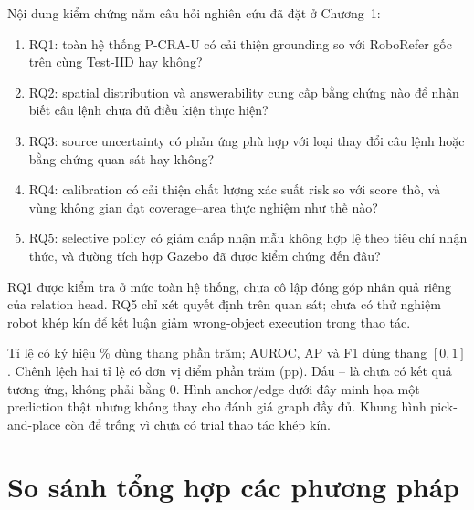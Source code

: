 Nội dung kiểm chứng năm câu hỏi nghiên cứu đã đặt ở Chương~1:
\begin{enumerate}
    \item RQ1: toàn hệ thống P-CRA-U có cải thiện grounding so với
    RoboRefer gốc trên cùng Test-IID hay không?
    \item RQ2: spatial distribution và answerability cung cấp
    bằng chứng nào để nhận biết câu lệnh chưa đủ điều kiện
    thực hiện?
    \item RQ3: source uncertainty có phản ứng phù hợp với
    loại thay đổi câu lệnh hoặc bằng chứng quan sát hay không?
    \item RQ4: calibration có cải thiện chất lượng xác suất
    risk so với score thô, và vùng không gian đạt
    coverage--area thực nghiệm như thế nào?
    \item RQ5: selective policy có giảm chấp nhận mẫu không
    hợp lệ theo tiêu chí nhận thức, và đường tích hợp
    Gazebo đã được kiểm chứng đến đâu?
\end{enumerate}
RQ1 được kiểm tra ở mức toàn hệ thống, chưa cô lập đóng góp
nhân quả riêng của relation head. RQ5 chỉ xét quyết định trên
quan sát; chưa có thử nghiệm robot khép kín để kết luận giảm
wrong-object execution trong thao tác.

Tỉ lệ có ký hiệu \% dùng thang phần trăm; AUROC, AP và F1 dùng thang
$[0,1]$. Chênh lệch hai tỉ lệ có đơn vị điểm phần trăm (pp).
Dấu -- là chưa có kết quả tương ứng, không phải bằng 0.
Hình anchor/edge dưới đây minh họa một prediction thật nhưng không thay
cho đánh giá graph đầy đủ. Khung hình pick-and-place còn để trống vì
chưa có trial thao tác khép kín.

\section{So sánh tổng hợp các phương pháp}
\label{sec:results-overall-comparison}

